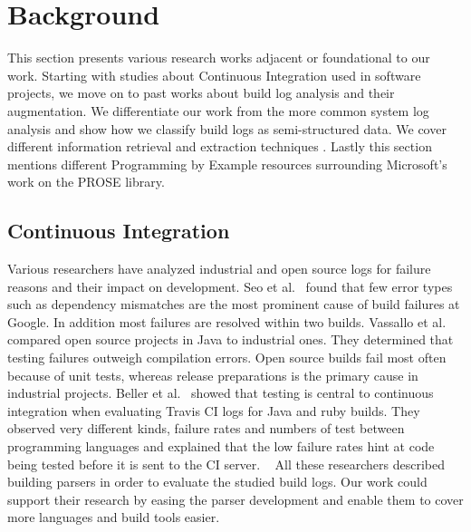 \documentclass[\myrootdir/main.tex]{subfiles}
\begin{document}
\chapter{Background}
\label{sec:rw}
This section presents various research works adjacent or foundational to our work.
Starting with studies about Continuous Integration used in software projects, we move on to past works about build log analysis and their augmentation.
We differentiate our work from the more common system log analysis and show how we classify build logs as semi-structured data.
We cover different information retrieval and extraction techniques .
Lastly this section mentions different Programming by Example resources surrounding Microsoft's work on the PROSE library.

\section{Continuous Integration}
Various researchers have analyzed industrial and open source logs for failure reasons and their impact on development. Seo et al.~\cite{seo2014programmers} found that few error types such as dependency mismatches are the most prominent cause of build failures at Google. In addition most failures are resolved within two builds. Vassallo et al.~\cite{vassallo2017a-tale} compared open source projects in Java to industrial ones. They determined that testing failures outweigh compilation errors. Open source builds fail most often because of unit tests, whereas release preparations is the primary cause in industrial projects. Beller et al.~\cite{beller2017oops} showed that testing is central to continuous integration when evaluating Travis CI logs for Java and ruby builds. They observed very different kinds, failure rates and numbers of test between programming languages and explained that the low failure rates hint at code being tested before it is sent to the CI server.
~\cite{vassallo2019every}
All these researchers described building parsers in order to evaluate the studied build logs. Our work could support their research by easing the parser development and enable them to cover more languages and build tools easier.
\end{document}
